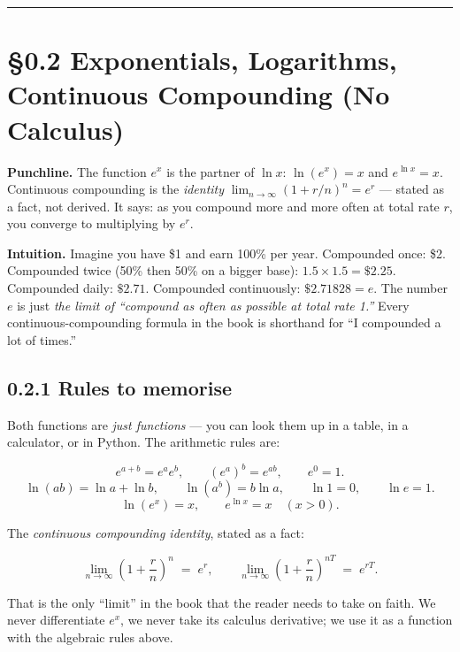 \documentclass[
  10pt,
  twoside]{book}
\begin{document}
\begin{center}\rule{0.5\linewidth}{0.5pt}\end{center}

\section{§0.2 Exponentials, Logarithms, Continuous Compounding (No
Calculus)}\label{exponentials-logarithms-continuous-compounding-no-calculus}

\textbf{Punchline.} The function \(e^x\) is the partner of \(\ln x\):
\(\ln(e^x) = x\) and \(e^{\ln x} = x\). Continuous compounding is the
\emph{identity} \(\lim_{n\to\infty}(1 + r/n)^n = e^r\) --- stated as a
fact, not derived. It says: as you compound more and more often at total
rate \(r\), you converge to multiplying by \(e^r\).

\textbf{Intuition.} Imagine you have \$1 and earn 100\% per year.
Compounded once: \$2. Compounded twice (50\% then 50\% on a bigger
base): \(1.5 \times 1.5 = \$2.25\). Compounded daily: \(\$2.71\).
Compounded continuously: \(\$2.71828 = e\). The number \(e\) is just
\emph{the limit of ``compound as often as possible at total rate 1.''}
Every continuous-compounding formula in the book is shorthand for ``I
compounded a lot of times.''

\subsection{0.2.1 Rules to memorise}\label{rules-to-memorise}

Both functions are \emph{just functions} --- you can look them up in a
table, in a calculator, or in Python. The arithmetic rules are:

\[e^{a+b} = e^a e^b, \qquad (e^a)^b = e^{ab}, \qquad e^0 = 1.\]
\[\ln(ab) = \ln a + \ln b, \qquad \ln(a^b) = b \ln a, \qquad \ln 1 = 0, \qquad \ln e = 1.\]
\[\ln(e^x) = x, \qquad e^{\ln x} = x \quad (x > 0).\]

The \emph{continuous compounding identity}, stated as a fact:

\[\lim_{n \to \infty} \left(1 + \frac{r}{n}\right)^{n} \;=\; e^{r}, \qquad \lim_{n \to \infty} \left(1 + \frac{r}{n}\right)^{nT} \;=\; e^{rT}.\]

That is the only ``limit'' in the book that the reader needs to take on
faith. We never differentiate \(e^x\), we never take its calculus
derivative; we use it as a function with the algebraic rules above.
\end{document}
